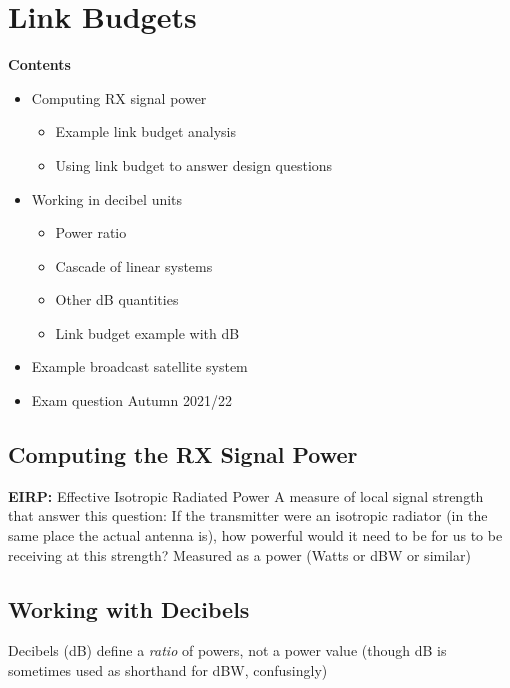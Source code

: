 \documentclass[12pt]{article}
\begin{document}
\section{Link Budgets}
\textbf{Contents}

\begin{itemize}[noitemsep]
    \item Computing RX signal power
    \begin{itemize}[noitemsep]
        \item Example link budget analysis
        \item Using link budget to answer design questions
    \end{itemize}
    \item Working in decibel units
    \begin{itemize}[noitemsep]
        \item Power ratio
        \item Cascade of linear systems
        \item Other dB quantities
        \item Link budget example with dB
    \end{itemize}
    \item Example broadcast satellite system
    \item Exam question Autumn 2021/22
\end{itemize}

\subsection{Computing the RX Signal Power}

\textbf{EIRP:} Effective Isotropic Radiated Power
A measure of local signal strength that answer this question: If the transmitter were an isotropic radiator (in the same place the actual antenna is), how powerful would it need to be for us to be receiving at this strength?
Measured as a power (Watts or dBW or similar)

\begin{flushright}[Lecture on 2.5]\end{flushright}

\subsection{Working with Decibels}
Decibels (dB) define a \textit{ratio} of powers, not a power value (though dB is sometimes used as shorthand for dBW, confusingly)
\end{document}
